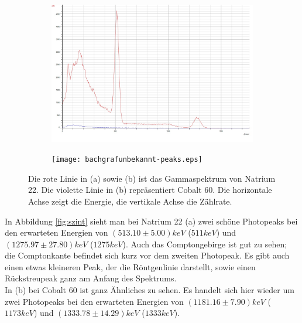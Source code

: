 \documentclass{article}
\begin{document}
\begin{center}
\begin{figure}[H]
\begin{subfigure}{0.52\textwidth}
\includegraphics[width=0.9\linewidth]{bachgrafbild.jpg}
\caption{}
\end{subfigure}
\begin{subfigure}{0.52\textwidth}
\texttt{[image: bachgrafunbekannt-peaks.eps]}
\caption{}
\end{subfigure}
\caption{Die rote Linie in (a) sowie (b) ist das Gammaspektrum von Natrium 22. Die violette Linie in (b) repräsentiert Cobalt 60. Die horizontale Achse zeigt die Energie, die vertikale Achse die Zählrate.}
\end{figure}
\label{fig:szint}
\end{center}

In Abbildung \ref{fig:szint} sieht man bei Natrium 22 (a) zwei schöne Photopeaks bei den erwarteten Energien von $(513.10 \pm 5.00)\si{keV}$ ($511\si{keV}$) und $(1275.97 \pm 27.80)\si{keV}$ ($1275\si{keV}$). Auch das Comptongebirge ist gut zu sehen; die Comptonkante befindet sich kurz vor dem zweiten Photopeak. Es gibt auch einen etwas kleineren Peak, der die Röntgenlinie darstellt, sowie einen Rückstreupeak ganz am Anfang des Spektrums.\\
In (b) bei Cobalt 60 ist ganz Ähnliches zu sehen. Es handelt sich hier wieder um zwei Photopeaks bei den erwarteten Energien von $(1181.16 \pm 7.90)\si{keV}$ ($1173\si{keV}$) und $(1333.78 \pm 14.29)\si{keV}$ ($1333\si{keV}$).
\end{document}
